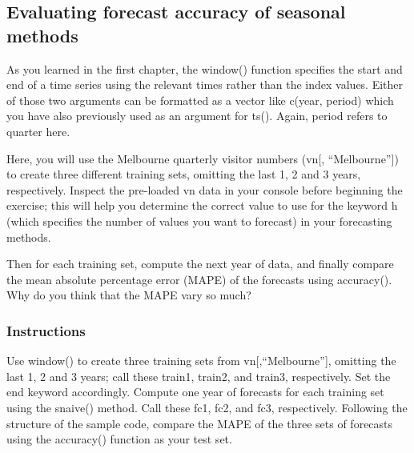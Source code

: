 \documentclass[
  letterpaper,
  DIV=11,
  numbers=noendperiod]{scrartcl}
\begin{document}
\hypertarget{evaluating-forecast-accuracy-of-seasonal-methods}{%
\subsection{Evaluating forecast accuracy of seasonal
methods}\label{evaluating-forecast-accuracy-of-seasonal-methods}}

As you learned in the first chapter, the window() function specifies the
start and end of a time series using the relevant times rather than the
index values. Either of those two arguments can be formatted as a vector
like c(year, period) which you have also previously used as an argument
for ts(). Again, period refers to quarter here.

Here, you will use the Melbourne quarterly visitor numbers (vn{[},
``Melbourne''{]}) to create three different training sets, omitting the
last 1, 2 and 3 years, respectively. Inspect the pre-loaded vn data in
your console before beginning the exercise; this will help you determine
the correct value to use for the keyword h (which specifies the number
of values you want to forecast) in your forecasting methods.

Then for each training set, compute the next year of data, and finally
compare the mean absolute percentage error (MAPE) of the forecasts using
accuracy(). Why do you think that the MAPE vary so much?

\hypertarget{instructions-7}{%
\subsubsection{Instructions}\label{instructions-7}}

Use window() to create three training sets from vn{[},``Melbourne''{]},
omitting the last 1, 2 and 3 years; call these train1, train2, and
train3, respectively. Set the end keyword accordingly. Compute one year
of forecasts for each training set using the snaive() method. Call these
fc1, fc2, and fc3, respectively. Following the structure of the sample
code, compare the MAPE of the three sets of forecasts using the
accuracy() function as your test set.
\end{document}
